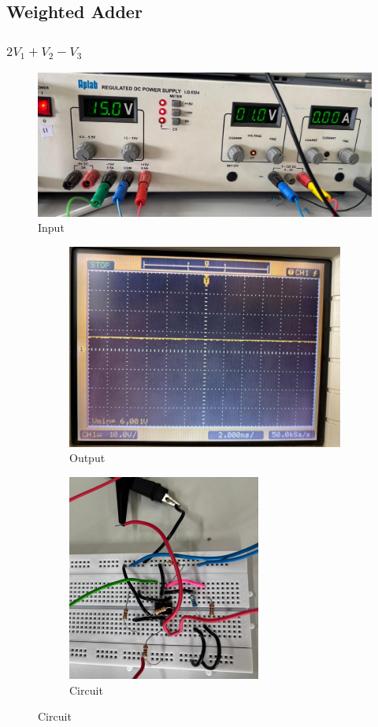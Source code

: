 \documentclass[a4paper,12pt]{article}
\begin{document}
\subsection*{Weighted Adder}
\subsubsection*{$2V_1 + V_2 - V_3$}
\begin{figure}[h!]
   \centering
   \includegraphics[width=\columnwidth]{figs/input1.png}
   \caption{Input}
\end{figure}
\pagebreak
\begin{figure}[!h]
	\begin{subfigure}[b]{100pt}
		\caption{Output}
		\includegraphics[width = 260pt]{figs/1add1.png}
	\end{subfigure}
	\hspace{110pt}
	\begin{subfigure}[b]{100pt}
		\caption{Circuit}
		\includegraphics[width = 180pt]{figs/1add2.png}
	\end{subfigure}
\end{figure}
\pagebreak
\end{document}
